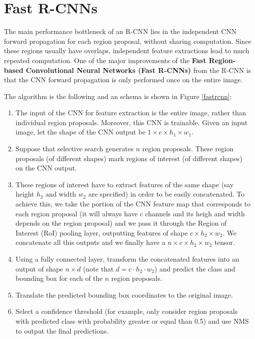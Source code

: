 \section{Fast R-CNNs}

The main performance bottleneck of an R-CNN lies in the independent CNN forward propagation for each region proposal, without sharing computation. Since these regions usually have overlaps, independent feature extractions lead to much repeated computation. One of the major improvements of the \textbf{Fast Region-based Convolutional Neural Networks (Fast R-CNNs)} from the R-CNN is that the CNN forward propagation is only performed once on the entire image.

The algorithm is the following and an schema is shown in Figure \ref{fastrcnn}:

\begin{enumerate}
\item The input of the CNN for feature extraction is the entire image, rather than individual region proposals. Moreover, this CNN is trainable. Given an input image, let the shape of the CNN output be $1 \times c \times h_1\times w_1$.
\item  Suppose that selective search generates $n$ region proposals. These region proposals (of different shapes) mark regions of interest (of different shapes) on the CNN output. 
\item These regions of interest have to extract features of the same shape (say height $h_2$ and width $w_2$ are specified) in order to be easily concatenated. To achieve this, we take the portion of the CNN feature map that corresponds to each region proposal (it will always have $c$ channels and its heigh and width depends on the region proposal) and we pass it through the Region of Interest (RoI) pooling layer, outputting features of shape $c\times h_2 \times w_2$. We concatenate all this outputs and we finally have a $n\times c\times h_2\times w_2$ tensor. 
\item Using a fully connected layer, transform the concatenated features into an output of shape $n\times d$ (note that $d=c\cdot h_2\cdot w_2$) and predict the class and bounding box for each of the $n$ region proposals.
\item Translate the predicted bounding box coordinates to the original image.
\item Select a confidence threshold (for example, only consider region proposals with predicted class with probability greater or equal than 0.5) and use NMS to output the final predictions.
\end{enumerate}

